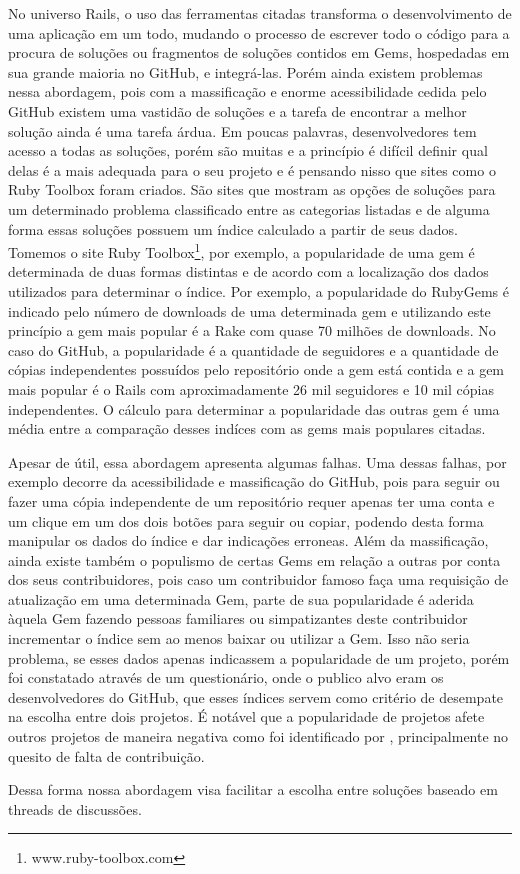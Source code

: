 No universo Rails, o uso das ferramentas citadas transforma o desenvolvimento de uma aplicação em um todo, mudando o processo de escrever todo o código para a procura de soluções ou fragmentos de soluções contidos em Gems, hospedadas em sua grande maioria no GitHub, e integrá-las. Porém ainda existem problemas nessa abordagem, pois com a massificação e enorme acessibilidade cedida pelo GitHub existem uma vastidão de soluções e a tarefa de encontrar a melhor solução ainda é uma tarefa árdua. Em poucas palavras, desenvolvedores tem acesso a todas as soluções, porém são muitas e a princípio é difícil definir qual delas é a mais adequada para o seu projeto e é pensando nisso que sites como o Ruby Toolbox foram criados. São sites que mostram as opções de soluções para um determinado problema classificado entre as categorias listadas e de alguma forma essas soluções possuem um índice calculado a partir de seus dados. Tomemos o site Ruby Toolbox\footnote{www.ruby-toolbox.com}, por exemplo, a popularidade de uma gem é determinada de duas formas distintas e de acordo com a localização dos dados utilizados para determinar o índice. Por exemplo, a popularidade do RubyGems é indicado pelo número de downloads de uma determinada gem e utilizando este princípio a gem mais popular é a Rake com quase 70 milhões de downloads. No caso do GitHub, a popularidade é a quantidade de seguidores e a quantidade de cópias independentes possuídos pelo repositório onde a gem está contida e a gem mais popular é o Rails com aproximadamente 26 mil seguidores e 10 mil cópias independentes. O cálculo para determinar a popularidade das outras gem é uma média entre a comparação desses indíces com as gems mais populares citadas.

Apesar de útil, essa abordagem apresenta algumas falhas. Uma dessas falhas, por exemplo decorre da acessibilidade e massificação do GitHub, pois para seguir ou fazer uma cópia independente de um repositório requer apenas ter uma conta e um clique em um dos dois botões para seguir ou copiar, podendo desta forma manipular os dados do índice e dar indicações erroneas. Além da massificação, ainda existe também o populismo de certas Gems em relação a outras por conta dos seus contribuidores, pois caso um contribuidor famoso faça uma requisição de atualização em uma determinada Gem, parte de sua popularidade é aderida àquela Gem fazendo pessoas familiares ou simpatizantes deste contribuidor incrementar o índice sem ao menos baixar ou utilizar a Gem. Isso não seria problema, se esses dados apenas indicassem a popularidade de um projeto, porém foi constatado através de um questionário, onde o publico alvo eram os desenvolvedores do GitHub, que esses índices servem como critério de desempate na escolha entre dois projetos. É notável que a popularidade de projetos afete outros projetos de maneira negativa como foi identificado por \cite{michlmayr:quality_problems}, principalmente no quesito de falta de contribuição. 

Dessa forma nossa abordagem visa facilitar a escolha entre soluções baseado em threads de discussões.